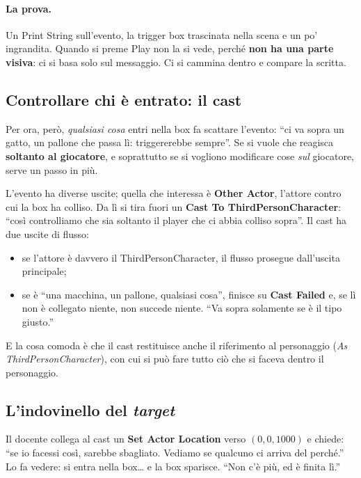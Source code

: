 \paragraph{La prova.} Un Print String sull'evento, la trigger box trascinata
nella scena e un po' ingrandita. Quando si preme Play non la si vede, perché
\textbf{non ha una parte visiva}: ci si basa solo sul messaggio. Ci si
cammina dentro e compare la scritta.

\subsection{Controllare chi è entrato: il cast}

Per ora, però, \emph{qualsiasi cosa} entri nella box fa scattare l'evento:
``ci va sopra un gatto, un pallone che passa lì: triggererebbe sempre''. Se si
vuole che reagisca \textbf{soltanto al giocatore}, e soprattutto se si vogliono
modificare cose \emph{sul} giocatore, serve un passo in più.

L'evento ha diverse uscite; quella che interessa è \textbf{Other Actor},
l'attore contro cui la box ha colliso. Da lì si tira fuori un \textbf{Cast To
ThirdPersonCharacter}: ``così controlliamo che sia soltanto il player che ci
abbia colliso sopra''. Il cast ha due uscite di flusso:
\begin{itemize}
  \item se l'attore è davvero il ThirdPersonCharacter, il flusso prosegue
        dall'uscita principale;
  \item se è ``una macchina, un pallone, qualsiasi cosa'', finisce su
        \textbf{Cast Failed} e, se lì non è collegato niente, non succede
        niente. ``Va sopra solamente se è il tipo giusto.''
\end{itemize}
E la cosa comoda è che il cast restituisce anche il riferimento al personaggio
(\emph{As ThirdPersonCharacter}), con cui si può fare tutto ciò che si faceva
dentro il personaggio.

\subsection{L'indovinello del \emph{target}}

Il docente collega al cast un \textbf{Set Actor Location} verso
$(0, 0, 1000)$ e chiede: ``se io facessi così, sarebbe sbagliato. Vediamo se
qualcuno ci arriva del perché.'' Lo fa vedere: si entra nella box\dots{} e la
box sparisce. ``Non c'è più, ed è finita lì.''

